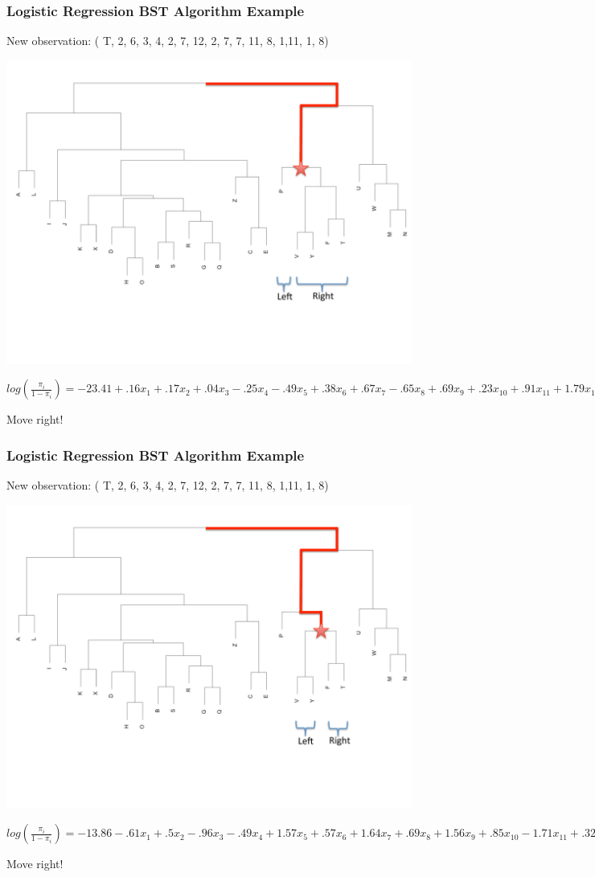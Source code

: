 \documentclass{beamer}
\begin{document}
\begin{frame}
\frametitle{\small{Logistic Regression BST Algorithm Example}}
\small{New observation: ( T, 2,     6,     3,    4,     2,     7,    12,      2,      7,      7,      11,       8,     1,11,     1,      8)}
\begin{center} 
\includegraphics[width=.7 \textwidth]{thirdStep}

\tiny{$log(\frac{\pi_i}{1-\pi_i})= -23.41+.16x_1+.17x_2+.04x_3-.25x_4-.49x_5+.38x_6+.67x_7-.65x_8+.69x_{9}+.23x_{10}+.91x_{11}+1.79x_{12}+.36x_{13}-.1x_{14}+.07x_{15}-.29x_{16} \rightarrow \hat{\pi}=0.999$}
\end{center}
Move right!

\end{frame}


\begin{frame}
\frametitle{\small{Logistic Regression BST Algorithm Example}}
\small{New observation: ( T, 2,     6,     3,    4,     2,     7,    12,      2,      7,      7,      11,       8,     1,11,     1,      8)}
\begin{center} 
\includegraphics[width=.7 \textwidth]{fourthStep}

\tiny{$log(\frac{\pi_i}{1-\pi_i})= -13.86-.61x_1+.5x_2-.96x_3-.49x_4+1.57x_5+.57x_6+1.64x_7+.69x_8+1.56x_{9}+.85x_{10}-1.71x_{11}+.32x_{12}-.65x_{13}-.96x_{14}-.55x_{15}+.58x_{16} \rightarrow \hat{\pi}=0.991$}
\end{center}
Move right!

\end{frame}
\end{document}
